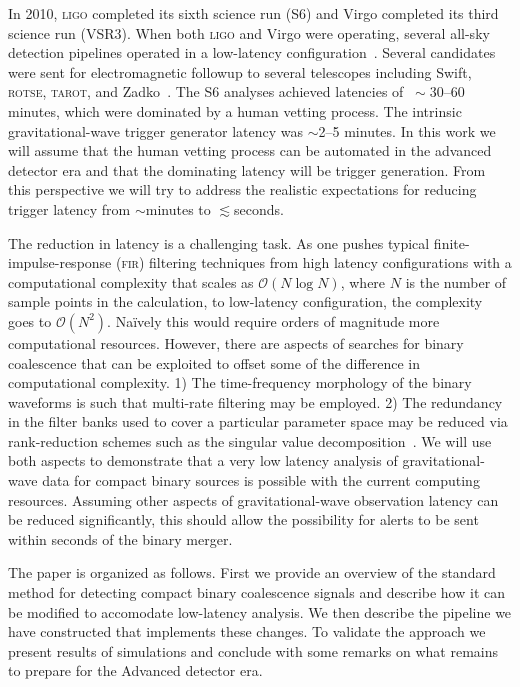 In 2010, \textsc{ligo} completed its sixth science run (S6) and Virgo
completed its third science run (VSR3). When both \textsc{ligo} and Virgo were
operating, several all-sky detection pipelines operated in a low-latency
configuration~\cite{HugheyGWPAW2011, S6lowlatency}. Several candidates were sent
for electromagnetic followup to several telescopes including Swift,
\textsc{rotse}, \textsc{tarot}, and Zadko~\cite{kanner2008, HugheyGWPAW2011}.
The S6 analyses achieved latencies of $~\sim30$--$60$ minutes, which were
dominated by
a human vetting process. The intrinsic gravitational-wave trigger generator
latency was $\sim$2--5 minutes. In this work we will assume that the human
vetting process can be automated in the advanced detector era and that the
dominating latency will be trigger generation. From this perspective we will
try to address the realistic expectations for reducing trigger latency from
$\sim$minutes to $\lesssim$seconds.

The reduction in latency is a challenging task.  As one pushes typical
finite-impulse-response (\textsc{fir}) filtering techniques from high latency
configurations with a computational complexity that scales as
$\mathcal{O}(N\log{N})$, where $N$ is the number of sample points in the
calculation, to low-latency configuration, the complexity goes to
$\mathcal{O}(N^2)$. Na\"ively this would require orders of magnitude more
computational resources. However, there are aspects of searches for binary
coalescence that can be exploited to offset some of the difference in
computational complexity. 1) The time-frequency morphology of the binary
waveforms is such that multi-rate filtering may be employed. 2) The redundancy
in the filter banks used to cover a particular parameter space may be
reduced via rank-reduction schemes such as the singular value
decomposition~\cite{Cannon:2010p10398}. We will use both aspects to
demonstrate that a very low latency analysis of gravitational-wave data for
compact binary sources is possible with the current computing resources.
Assuming other aspects of gravitational-wave observation latency
can be reduced significantly, this should allow the possibility for alerts to
be sent within seconds of the binary merger.

The paper is organized as follows. First we provide an overview of the
standard method for detecting compact binary coalescence signals and
describe how it can be modified to accomodate low-latency analysis. We
then describe the pipeline we have constructed that implements these changes.
To validate the approach we present results of simulations and conclude
with some remarks on what remains to prepare for the Advanced detector era.

